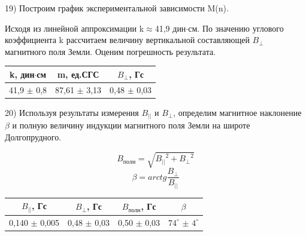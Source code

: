 \documentclass[a4paper,12pt]{article}
\begin{document}
19) Построим график экспериментальной зависимости M(n).



Исходя из линейной аппроксимации k$\approx$41,9 дин$\cdot$см. По значению углового коэффициента k рассчитаем величину вертикальной составляющей $B_{\perp}$ магнитного поля Земли. Оценим погрешность результата.

\begin{center}
\begin{tabular}{|c|c|c|}
	\hline
	k, дин$\cdot$см & m, ед.СГС & $B_{\perp}$, Гс \\
	\hline
	41,9 $\pm$ 0,8 & 87,61 $\pm$ 3,13 & 0,48 $\pm$ 0,03 \\
	\hline
\end{tabular}
\end{center}

20) Используя результаты измерения $B_{||}$ и $B_{\perp}$, определим магнитное наклонение $\beta$ и полную величину индукции магнитного поля Земли на широте Долгопрудного.

$$ B_{полн} = \sqrt{{B_{||}}^2+{B_{\perp}}^2} $$
$$ \beta = arctg\frac{B_{\perp}}{B_{||}}$$

\begin{center}
\begin{tabular}{|c|c|c|c|}
	\hline
	$B_{||}$, Гс & $B_{\perp}$, Гс & $B_{\text{полн}}$, Гс & $\beta$ \\
	\hline
	0,140 $\pm$ 0,005 & 0,48 $\pm$ 0,03 & 0,50 $\pm$ 0,03 & $74^{\circ}$ $\pm$ $4^{\circ}$\\
	\hline
\end{tabular}
\end{center}
\end{document}
